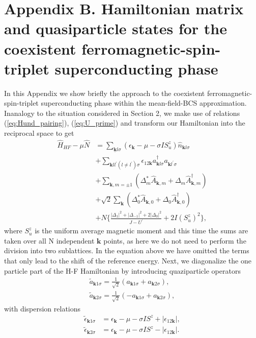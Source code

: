 \documentclass[aps,prb,showpacs,reprint]{revtex4-1}
\begin{document}
\section*{Appendix B. Hamiltonian matrix and quasiparticle states for the coexistent ferromagnetic-spin-triplet superconducting phase}
In this Appendix we show briefly the approach to the coexistent
ferromagnetic-spin-triplet superconducting phase within the mean-field-BCS
approximation. Inanalogy to the situation considered in Section 2, we make use
of relations (\ref{eq:Hund_pairing}), (\ref{eq:U_prime}) and transform our
Hamiltonian into the reciprocal space to get
\begin{equation}
\begin{split}
\hat{H}_{HF}-\mu\hat{N}&=\sum_{\underline{\mathbf{k}}l\sigma}(\epsilon_{
\mathbf { k}}-\mu-\sigma
IS^z_u)\hat{n}_{\mathbf{k}l\sigma}\\
&+\sum_{\mathbf{k}
ll^ { \prime}(l\neq l^{\prime})\sigma}\epsilon_{12\mathbf{k}}
a_{\mathbf{k}l\sigma}^{\dag}a_{\mathbf{k}l^{\prime}
\sigma} \\
&+\sum_{\mathbf{k},m=\pm
1}(\Delta_{m}^{*}\hat{A}_{\mathbf{k},m}+\Delta_{m}\hat{A}_{
\mathbf{k},m}^{\dagger})\\
&+\sqrt{2}\sum_{\mathbf{k}}
(\Delta_{0}^{*}\hat{A}_{
\mathbf{k},0}+\Delta_{0}\hat{A}_{\mathbf{k},0}^{\dagger}) \\
&+N\bigg\{\frac{|\Delta_1|^2+|\Delta_{-1}|^2+2|\Delta_{0}
|^2}{J-U^{\prime}}+2I(S^z_u)^2\bigg\},
\end{split}
\label{eq:h_HF_calosc_A1FM}
\end{equation}
where $S^z_u$ is the uniform average magnetic moment and this time the sums are
taken over all N independent $\mathbf{k}$ points, as here we do not need to
perform the division into two sublattices. In the equation above we have
omitted the terms that only lead to the shift of the
reference energy. Next, we diagonalize the one
particle part of the H-F Hamiltonian by introducing quaziparticle operators 
\begin{equation}
\begin{split}
\tilde{a}_{\mathbf{k}1\sigma}=\frac{1}{\sqrt{2}}(a_{
\mathbf{k}1\sigma}+a_{\mathbf{k}2\sigma}),\\
\tilde{a}_{\mathbf{k}2\sigma}=\frac{1}{\sqrt{2}}(-a_{
\mathbf{k}1\sigma}+a_{\mathbf{k}2\sigma}),
\label{eq:kwaziczastki}
\end{split}
\end{equation}
with dispersion relations
\begin{equation}
\begin{split}
\tilde{\epsilon}_{\mathbf{k}1\sigma}&=\epsilon_{\mathbf{k}
}-\mu- \sigma IS^z + |\epsilon_{12\mathbf{k}}|,\\
\tilde{\epsilon}_{\mathbf{k}2\sigma}&=\epsilon_{\mathbf{k
}}-\mu- \sigma IS^z - |\epsilon_{12\mathbf{k}}|.
\label{eq:eigenvalues_S_22}
\end{split}
\end{equation}
\end{document}
